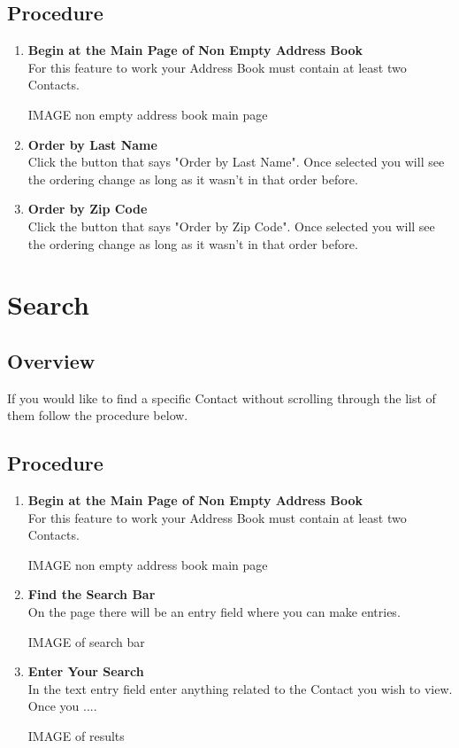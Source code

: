 \documentclass[a4paper, 11pt]{article}
\begin{document}
\subsection{Procedure}
\begin{enumerate}[label=\textbf{\arabic*})]
    \item{\textbf{Begin at the Main Page of Non Empty Address Book}}\\ For this feature to work your Address Book must contain at least two Contacts.
    
    IMAGE non empty address book main page
    
    \item{\textbf{Order by Last Name}}\\ Click the button that says "Order by Last Name". Once selected you will see the ordering change as long as it wasn't in that order before. 
    
    \item{\textbf{Order by Zip Code}}\\ Click the button that says "Order by Zip Code". Once selected you will see the ordering change as long as it wasn't in that order before.
\end{enumerate}


\section{Search}
\subsection{Overview}
If you would like to find a specific Contact without scrolling through the list of them follow the procedure below.
\subsection{Procedure}
\begin{enumerate}[label=\textbf{\arabic*})]
    \item{\textbf{Begin at the Main Page of Non Empty Address Book}}\\ For this feature to work your Address Book must contain at least two Contacts.
    
    IMAGE non empty address book main page
    
    \item{\textbf{Find the Search Bar}}\\ On the page there will be an entry field where you can make entries. 
    
    IMAGE of search bar
    
    \item{\textbf{Enter Your Search}}\\ In the text entry field enter anything related to the Contact you wish to view. Once you ....
    
    IMAGE of results 

\end{enumerate}
\end{document}
